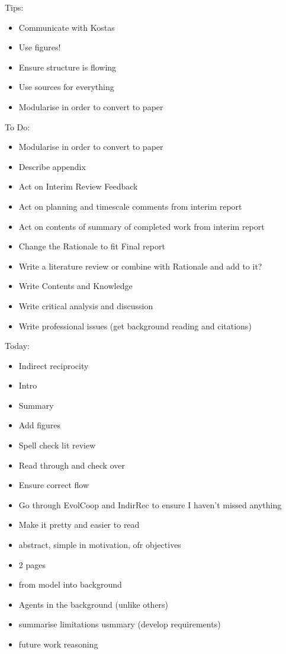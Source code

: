 \documentclass[]{final_report}
\begin{document}
Tips:\begin{itemize}
	\item Communicate with Kostas
	\item Use figures!
	\item Ensure structure is flowing
	\item Use sources for everything
	\item Modularise in order to convert to paper
\end{itemize}
To Do:
\begin{itemize}
	\item Modularise in order to convert to paper
	\item Describe appendix
	\item Act on Interim Review Feedback
	\item Act on planning and timescale comments from interim report
	\item Act on contents of summary of completed work from interim report
	\item Change the Rationale to fit Final report
	\item Write a literature review or combine with Rationale and add to it?
	\item Write Contents and Knowledge
	\item Write critical analysis and discussion
	\item Write professional issues (get background reading and citations)
\end{itemize}
Today:
\begin{itemize}
 	\item Indirect reciprocity
	\item Intro
	\item Summary
	\item Add figures
	\item Spell check lit review
	\item Read through and check over
	\item Ensure correct flow
	\item Go through EvolCoop and IndirRec to ensure I haven't missed anything
	\item Make it pretty and easier to read
	\item abstract, simple in motivation, ofr objectives
	\item 2 pages
	\item from model into background
	\item Agents in the background (unlike others)
	\item summarise limitations usmmary (develop requirements)
	\item future work reasoning
\end{itemize}
\end{document}
